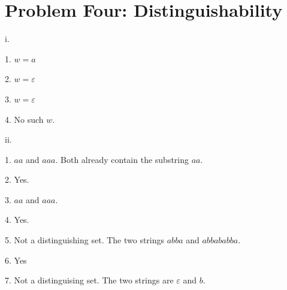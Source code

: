 \documentclass{article}
\renewcommand{\(}{\left(}
\renewcommand{\)}{\right)}
\theoremstyle{plain}
\theoremstyle{plain}
\theoremstyle{definition}
\begin{document}
\newpage

\section*{Problem Four: Distinguishability}
    i.
    \begin{shaded}
        1. $w=a$

        \vspace*{4mm}

        2. $w=\varepsilon$

        \vspace*{4mm}


        3. $w=\varepsilon$

        \vspace*{4mm}


        4. No such $w$.
    \end{shaded}
    
    ii.
    \begin{shaded}
        1. $aa$ and $aaa$. Both already contain the substring $aa$.

        \vspace*{4mm}

        2. Yes.

        \vspace*{4mm}

        3. $aa$ and $aaa$.

        \vspace*{4mm}

        4. Yes.

        \vspace*{4mm}

        5. Not a distinguishing set. The two strings $abba$ and $abbababba$.

        \vspace*{4mm}

        6. Yes

        \vspace*{4mm}

        7. Not a distinguising set. The two strings are $\varepsilon$ and $b$.
    \end{shaded}
    
\end{document}
